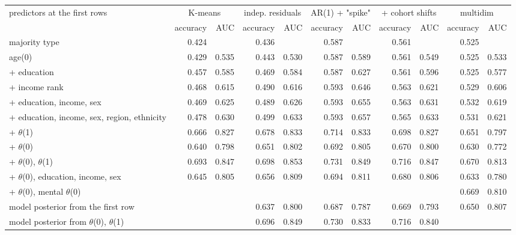 \begin{tabular}{lrrrrrrrrrr}
\toprule
predictors at the first rows & \multicolumn{2}{c}{K-means} & \multicolumn{2}{c}{indep. residuals} & \multicolumn{2}{c}{AR(1) + "spike"} & \multicolumn{2}{c}{+ cohort shifts} & \multicolumn{2}{c}{multidim} \\
\cmidrule(lr){2-3} \cmidrule(lr){4-5} \cmidrule(lr){6-7} \cmidrule(lr){8-9} \cmidrule(lr){10-11}
 & accuracy & AUC & accuracy & AUC & accuracy & AUC & accuracy & AUC & accuracy & AUC \\
\midrule
majority type & 0.424 &  & 0.436 &  & 0.587 &  & 0.561 &  & 0.525 &  \\
age(0) & 0.429 & 0.535 & 0.443 & 0.530 & 0.587 & 0.589 & 0.561 & 0.549 & 0.525 & 0.533 \\
+ education & 0.457 & 0.585 & 0.469 & 0.584 & 0.587 & 0.627 & 0.561 & 0.596 & 0.525 & 0.577 \\
+ income rank & 0.468 & 0.615 & 0.490 & 0.616 & 0.593 & 0.646 & 0.563 & 0.621 & 0.529 & 0.606 \\
+ education, income, sex & 0.469 & 0.625 & 0.489 & 0.626 & 0.593 & 0.655 & 0.563 & 0.631 & 0.532 & 0.619 \\
+ education, income, sex, region, ethnicity & 0.478 & 0.630 & 0.499 & 0.633 & 0.593 & 0.657 & 0.565 & 0.633 & 0.531 & 0.621 \\
+ $\theta$(1) & 0.666 & 0.827 & 0.678 & 0.833 & 0.714 & 0.833 & 0.698 & 0.827 & 0.651 & 0.797 \\
+ $\theta$(0) & 0.640 & 0.798 & 0.651 & 0.802 & 0.692 & 0.805 & 0.670 & 0.800 & 0.630 & 0.772 \\
+ $\theta$(0), $\theta$(1) & 0.693 & 0.847 & 0.698 & 0.853 & 0.731 & 0.849 & 0.716 & 0.847 & 0.670 & 0.813 \\
+ $\theta$(0), education, income, sex & 0.645 & 0.805 & 0.656 & 0.809 & 0.694 & 0.811 & 0.680 & 0.806 & 0.633 & 0.780 \\
+ $\theta$(0), mental $\theta$(0) &  &  &  &  &  &  &  &  & 0.669 & 0.810 \\
model posterior from the first row &  &  & 0.637 & 0.800 & 0.687 & 0.787 & 0.669 & 0.793 & 0.650 & 0.807 \\
model posterior from $\theta$(0), $\theta$(1) &  &  & 0.696 & 0.849 & 0.730 & 0.833 & 0.716 & 0.840 &  &  \\
\bottomrule
\end{tabular}

